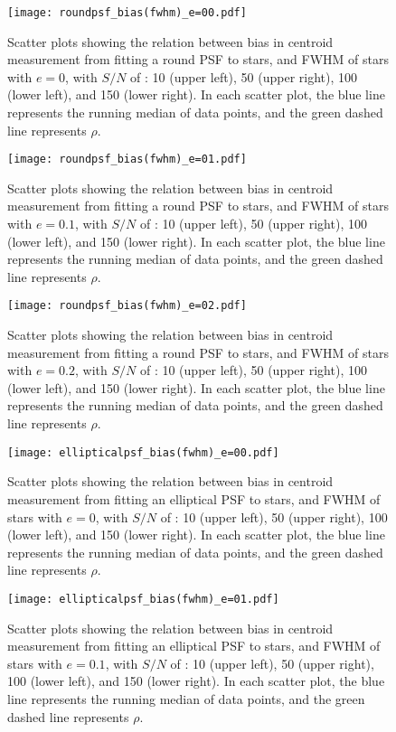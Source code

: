 \documentclass[12pt, preprint]{aastex}
\begin{document}
\begin{figure}[!htb]
  \texttt{[image: roundpsf\_bias(fwhm)\_e=00.pdf]}
\endminipage
\caption{Scatter plots showing the relation between bias in centroid measurement from fitting a round PSF to stars, and FWHM of stars with $e=0$, with $S/N$  of : 10 (upper left), 50 (upper right), 100 (lower left), and 150 (lower right). In each scatter plot, the blue line represents the running median of data points, and the green dashed line represents $\rho$.}\label{25}
\end{figure}

\begin{figure}[!htb]
  \texttt{[image: roundpsf\_bias(fwhm)\_e=01.pdf]}
\endminipage
\caption{Scatter plots showing the relation between bias in centroid measurement from fitting a round PSF to stars, and FWHM of stars with $e=0.1$, with $S/N$  of : 10 (upper left), 50 (upper right), 100 (lower left), and 150 (lower right). In each scatter plot, the blue line represents the running median of data points, and the green dashed line represents $\rho$.}\label{26}
\end{figure}

\begin{figure}[!htb]
  \texttt{[image: roundpsf\_bias(fwhm)\_e=02.pdf]}
\endminipage
\caption{Scatter plots showing the relation between bias in centroid measurement from fitting a round PSF to stars, and FWHM of stars with $e=0.2$, with $S/N$  of : 10 (upper left), 50 (upper right), 100 (lower left), and 150 (lower right). In each scatter plot, the blue line represents the running median of data points, and the green dashed line represents $\rho$.}\label{27}
\end{figure}

\begin{figure}[!htb]
  \texttt{[image: ellipticalpsf\_bias(fwhm)\_e=00.pdf]}
\endminipage
\caption{Scatter plots showing the relation between bias in centroid measurement from fitting an elliptical PSF to stars, and FWHM of stars with $e=0$, with $S/N$  of : 10 (upper left), 50 (upper right), 100 (lower left), and 150 (lower right). In each scatter plot, the blue line represents the running median of data points, and the green dashed line represents $\rho$.}\label{28}
\end{figure}

\begin{figure}[!htb]
  \texttt{[image: ellipticalpsf\_bias(fwhm)\_e=01.pdf]}
\endminipage
\caption{Scatter plots showing the relation between bias in centroid measurement from fitting an elliptical PSF to stars, and FWHM of stars with $e=0.1$, with $S/N$  of : 10 (upper left), 50 (upper right), 100 (lower left), and 150 (lower right). In each scatter plot, the blue line represents the running median of data points, and the green dashed line represents $\rho$.}\label{29}
\end{figure}
\end{document}
